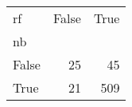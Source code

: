 \begin{tabular}{lrr}
\toprule
rf &  False &  True  \\
nb    &        &        \\
\midrule
False &     25 &     45 \\
True  &     21 &    509 \\
\bottomrule
\end{tabular}
